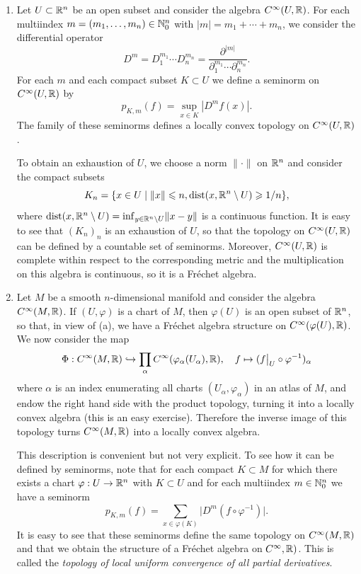 \begin{example}
    \begin{enumerate}[label=(\alph*)]
        \item Let $U\subset \mathbb{R}^n$ be an open subset and consider the algebra $C^\infty(U,\mathbb{R})$. For each multiindex $m=(m_1,\ldots,m_n)\in\mathbb{N}_0^n$ with $|m|=m_1+\cdots+m_n$, we consider the differential operator
        \[D^m=D_1^{m_1}\cdots D_n^{m_n}=\frac{\partial^{|m|}}{{\partial_1^{m_1}\cdots \partial_n^{m_n}}}.\]
        For each $m$ and each compact subset $K\subset U$ we define a seminorm on $C^\infty(U,\mathbb{R})$ by 
        \[p_{K,m}(f)=\sup_{x\in K}|D^mf(x)|.\]
        The family of these seminorms defines a locally convex topology on $C^\infty(U,\mathbb{R})$.

        To obtain an exhaustion of $U$, we choose a norm $\lVert\cdot\rVert$ on $\mathbb{R}^n$ and consider the compact subsets
        \[K_n=\{x\in U\mid \lVert x\rVert\leqslant n, \operatorname{dist}(x,\mathbb{R}^n\setminus U)\geqslant 1/n\},\]
        where $\operatorname{dist}(x,\mathbb{R}^n\setminus U)=\inf_{y\in \mathbb{R}^n\setminus U} \lVert x-y\rVert$ is a continuous function. It is easy to see that $(K_n)_n$ is an exhaustion of $U$, so that the topology on $C^\infty(U,\mathbb{R})$ can be defined by a countable set of seminorms. Moreover, $C^\infty(U,\mathbb{R})$ is complete within respect to the corresponding metric and the multiplication on this algebra is continuous, so it is a Fr\'echet algebra.
        
        \item Let $M$ be a smooth $n$-dimensional manifold and consider the algebra $C^\infty(M,\mathbb{R})$. If $(U,\varphi)$ is a chart of $M$, then $\varphi(U)$ is an open subset of $\mathbb{R}^n$, so that, in view of (a), we have a Fr\'echet algebra structure on $C^\infty(\varphi(U),\mathbb{R})$. We now consider the map
        \[\Phi:C^\infty(M,\bbR)\hookrightarrow \prod_{\alpha}C^\infty(\varphi_\alpha(U_\alpha),\bbR),\quad f\mapsto (\restr{f}{U}\circ \varphi^{-1})_\alpha\]
        where $\alpha$ is an index enumerating all charts $(U_\alpha,\varphi_\alpha)$ in an atlas of $M$, and endow the right hand side with the product topology, turning it into a locally convex algebra (this is an easy exercise). Therefore the inverse image of this topology turns $C^\infty(M,\mathbb{R})$ into a locally convex algebra.

        This description is convenient but not very explicit. To see how it can be defined by seminorms, note that for each compact $K\subset M$ for which there exists a chart $\varphi:U\to \mathbb{R}^n$ with $K\subset U$ and for each multiindex $m\in \mathbb{N}_0^n$ we have a seminorm
        \[p_{K,m}(f)=\sum_{x\in \varphi(K)}\lvert D^m(f\circ \varphi^{-1})\rvert.\]
        It is easy to see that these seminorms define the same topology on $C^\infty(M,\mathbb{R})$ and that we obtain the structure of a Fr\'echet algebra on $C^\infty,\mathbb{R})$. This is called the \emph{topology of local uniform convergence of all partial derivatives}.


\end{enumerate}
\end{example}
